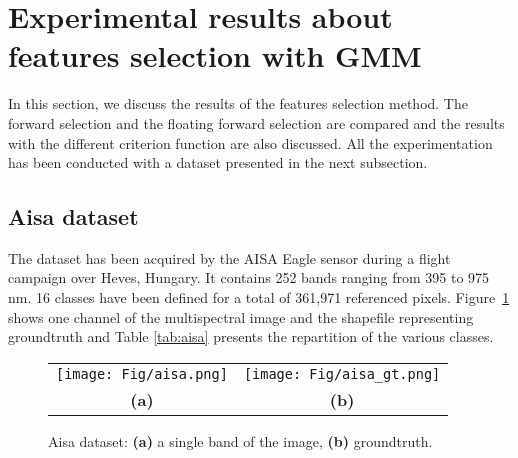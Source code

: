 \documentclass[a4paper,11pt,DIV=16]{scrartcl}
\begin{document}
    \section{Experimental results about features selection with GMM}

    In this section, we discuss the results of the features selection method. The forward selection and the floating forward selection are compared and the results with the different criterion function are also discussed. All the experimentation has been conducted with a dataset presented in the next subsection.

        \subsection{Aisa dataset}
        The dataset has been acquired by the AISA Eagle sensor during a flight campaign over Heves, Hungary. It contains 252 bands ranging from 395 to 975 nm. 16 classes have been defined for a total of 361,971 referenced pixels. Figure~\ref{fig:aisa} shows one channel of the multispectral image and the shapefile representing groundtruth and Table \ref{tab:aisa} presents the repartition of the various classes.

        \begin{figure}[!ht]
            \centering
            \begin{tabular}{cc}
                \texttt{[image: Fig/aisa.png]} &
                \texttt{[image: Fig/aisa\_gt.png]} \\
                {\bfseries{(a)}} & {\bfseries{(b)}} \\
            \end{tabular}
            \caption{Aisa dataset: {\bfseries{(a)}} a single band of the image, {\bfseries{(b)}} groundtruth.\label{fig:aisa}}
        \end{figure}
\end{document}
